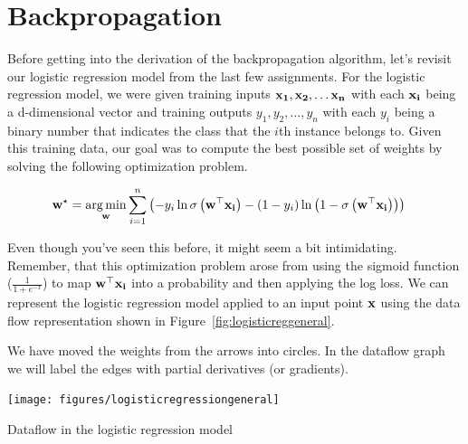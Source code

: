 \documentclass[assignment06_Solutions]{subfiles}
\begin{document}
\section{Backpropagation}

Before getting into the derivation of the backpropagation algorithm, let's revisit our logistic regression model from the last few assignments.  For the logistic regression model, we were given training inputs $\mathbf{x_1}, \mathbf{x_2}, \ldots \mathbf{x_n}$ with each $\mathbf{x_i}$ being a d-dimensional vector and training outputs $y_1, y_2, \ldots, y_n$ with each $y_i$ being a binary number that indicates the class that the $i$th instance belongs to.  Given this training data, our goal was to compute the best possible set of weights by solving the following optimization problem.

\begin{align}
\mathbf{w^\star} &= \operatorname*{arg\,min}_{\mathbf{w}} \sum_{i=1}^n \left ( -y_i \ln \sigma\left (\mathbf{w}^\top \mathbf{x_i} \right) - (1-y_i) \ln \left ( 1 - \sigma\left (\mathbf{w}^\top \mathbf{x_i} \right) \right) \right)
\end{align}

Even though you've seen this before, it might seem a bit intimidating.  Remember, that this optimization problem arose from using the sigmoid function ($\frac{1}{1+e^{-x}}$) to map $\mathbf{w}^\top \mathbf{x_i}$ into a probability and then applying the log loss.  We can represent the logistic regression model applied to an input point $\mathbf{x}$ using the data flow representation shown in Figure~\ref{fig:logisticreggeneral}.
\begin{notice}
We have moved the weights from the arrows into circles.  In the dataflow graph we will label the edges with partial derivatives (or gradients).
\end{notice}
\begin{marginfigure}
\texttt{[image: figures/logisticregressiongeneral]}
\caption{Dataflow in the logistic regression model}\label{fig:logisticreggeneral}
\end{marginfigure}
\end{document}
